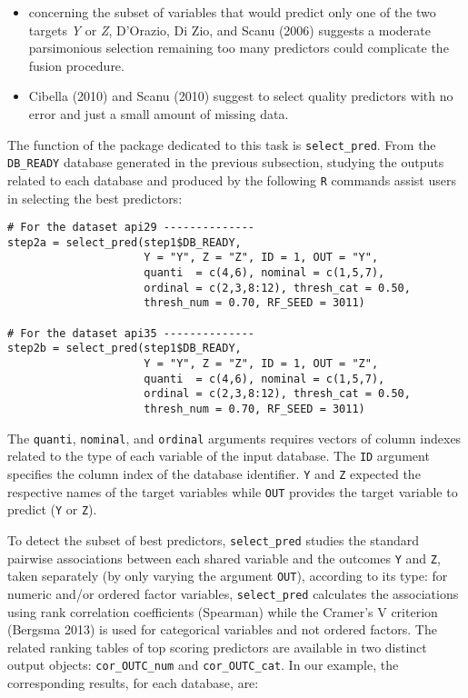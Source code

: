 \begin{itemize}
\tightlist
\item
  concerning the subset of variables that would predict only one of the two targets \emph{Y} or \emph{Z}, D'Orazio, Di Zio, and Scanu (2006) suggests a moderate parsimonious selection remaining too many predictors could complicate the fusion procedure.
\item
  Cibella (2010) and Scanu (2010) suggest to select quality predictors with no error and just a small amount of missing data.
\end{itemize}

The function of the package dedicated to this task is \texttt{select\_pred}. From the \texttt{DB\_READY} database
generated in the previous subsection, studying the outputs related to each database and produced by the following \texttt{R} commands assist users in selecting the best predictors:

\begin{verbatim}
# For the dataset api29 --------------
step2a = select_pred(step1$DB_READY,
                     Y = "Y", Z = "Z", ID = 1, OUT = "Y",
                     quanti  = c(4,6), nominal = c(1,5,7), 
                     ordinal = c(2,3,8:12), thresh_cat = 0.50, 
                     thresh_num = 0.70, RF_SEED = 3011)

# For the dataset api35 --------------
step2b = select_pred(step1$DB_READY,
                     Y = "Y", Z = "Z", ID = 1, OUT = "Z",
                     quanti  = c(4,6), nominal = c(1,5,7), 
                     ordinal = c(2,3,8:12), thresh_cat = 0.50, 
                     thresh_num = 0.70, RF_SEED = 3011)
\end{verbatim}

The \texttt{quanti}, \texttt{nominal}, and \texttt{ordinal} arguments requires vectors of column indexes related to the type
of each variable of the input database. The \texttt{ID} argument specifies the column index of the database identifier. \texttt{Y} and \texttt{Z} expected the respective names of the target variables while \texttt{OUT} provides the target variable to predict (\texttt{Y} or \texttt{Z}).

To detect the subset of best predictors, \texttt{select\_pred} studies the standard pairwise associations between
each shared variable and the outcomes \texttt{Y} and \texttt{Z}, taken separately (by only varying the argument \texttt{OUT}), according to its type: for numeric and/or ordered factor variables, \texttt{select\_pred} calculates the associations using rank correlation coefficients (Spearman) while the Cramer's V criterion (Bergsma 2013) is used for categorical variables and not ordered factors. The related ranking tables of top scoring predictors are available in two distinct output objects: \texttt{cor\_OUTC\_num} and \texttt{cor\_OUTC\_cat}. In our example, the corresponding results, for each database, are:

